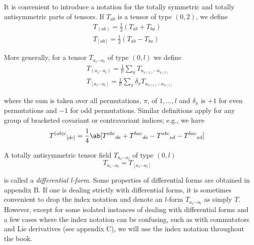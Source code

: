 It is convenient to introduce a notation for the totally symmetric and totally antisymmetric parts of tensors. If $T_{ab}$ is a tensor of type $(0,2)$, we define
\begin{align}
    T_{(ab)}=\frac12(T_{ab}+T_{ba})\label{2.4.1}\\
    T_{[ab]}=\frac12(T_{ab}-T_{ba})\label{2.4.2}
\end{align}

More generally, for a tensor $T_{a_1\cdots a_l}$ of type $(0,l)$ we define
\begin{align}
    & T_{(a_1\cdots a_l)}=\frac1{l!}\sum_\pi T_{a_{\pi(1)}\cdots a_{\pi(l)}}\label{2.4.3}\\
    & T_{[a_1\cdots a_l]}=\frac1{l!}\sum_\pi\delta_\pi T_{a_{\pi(1)}\cdots a_{\pi(l)}}\label{2.4.4}
\end{align}

where the sum is taken over all permutations, $\pi$, of $1,\ldots,l$ and $\delta_\pi$ is $+1$ for even permutations and $-1$ for odd permutations. Similar definitions apply for any group of bracketed covariant or contravariant indices; e.g., we have
\begin{equation}
    {T^{(ab)c}}_{[de]}=\frac14\ab[{T^{abc}}_{de}+{T^{bac}}_{de}-{T^{abc}}_{ed}-{T^{bac}}_{ed}]
    \label{2.4.5}
\end{equation}

A totally antisymmetric tensor field $T_{a_1\cdots a_l}$ of type $(0,l)$
\begin{equation}
    T_{a_1\cdots a_l}=T_{[a_1\cdots a_l]}
    \label{2.4.6}
\end{equation}

is called a \emph{differential l-form}. Some properties of differential forms are obtained in appendix B. If one is dealing strictly with differential forms, it is sometimes convenient to drop the index notation and denote an $l$-form $T_{a_1\cdots a_l}$ as simply $T$. However, except for some isolated instances of dealing with differential forms and a few cases where the index notation can be confusing, such as with commutators and Lie derivatives (see appendix C), we will use the index notation throughout the book.

\clearpage
